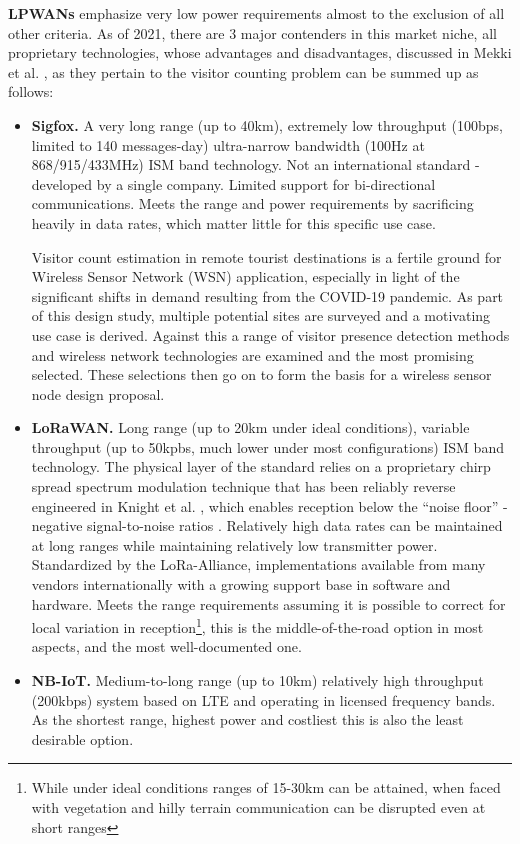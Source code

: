 \documentclass[10pt,nocopyrightspace]{ewsn-proc}
\begin{document}
\textbf{LPWANs} emphasize very low power requirements almost to the exclusion of all other criteria. As of 2021, there are 3 major contenders in this market niche, all proprietary technologies, whose advantages and disadvantages, discussed in Mekki et al. \cite{LPWAN-compare}, as they pertain to the visitor counting problem can be summed up as follows:
\begin{itemize}
\item \textbf{Sigfox.} A very long range (up to 40km), extremely low throughput (100bps, limited to 140 messages-day) ultra-narrow bandwidth (100Hz at 868/915/433MHz) ISM band technology. Not an international standard - developed by a single company. Limited support for bi-directional communications. Meets the range and power requirements by sacrificing heavily in data rates, which matter little for this specific use case. 

Visitor count estimation in remote tourist destinations is a fertile ground for Wireless Sensor Network (WSN) application, especially in light of the significant shifts in demand resulting from the COVID-19 pandemic. As part of this design study, multiple potential sites are surveyed and a motivating use case is derived. Against this a range of visitor presence detection methods and wireless network technologies are examined and the most promising selected. These selections then go on to form the basis for a wireless sensor node design proposal.  



\item \textbf{LoRaWAN.} Long range (up to 20km under ideal conditions), variable throughput (up to 50kpbs, much lower under most configurations) ISM band technology. The physical layer of the standard relies on a proprietary chirp spread spectrum modulation technique that has been reliably reverse engineered in Knight et al. \cite{Lora-decode}, which enables reception below the “noise floor” - negative signal-to-noise ratios \cite{Lora-docs}. Relatively high data rates can be maintained at long ranges while maintaining relatively low transmitter power. Standardized by the LoRa-Alliance, implementations available from many vendors internationally with a growing support base in software and hardware. Meets the range requirements assuming it is possible to correct for local variation in reception\footnote{While under ideal conditions\cite{LORAWAN-optimal} ranges of 15-30km can be attained, when faced with vegetation and hilly terrain communication can be disrupted even at short ranges\cite{LORAWAN-hills}}, this is the middle-of-the-road option in most aspects, and the most well-documented one.
\item \textbf{NB-IoT.} Medium-to-long range (up to 10km) relatively high throughput (200kbps) system based on LTE and operating in licensed frequency bands. As the shortest range, highest power and costliest this is also the least desirable option.
\end{itemize}
\end{document}

